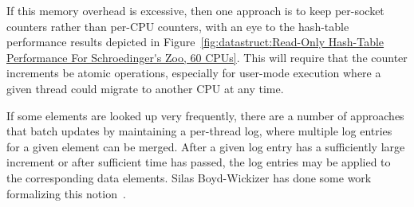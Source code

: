 If this memory overhead is excessive, then one approach is to keep
per-socket counters rather than per-CPU counters,
with an eye to the hash-table performance results depicted in
Figure~\ref{fig:datastruct:Read-Only Hash-Table Performance For Schroedinger's Zoo, 60 CPUs}.
This will require that the counter increments be atomic operations,
especially for user-mode execution where a given thread could migrate
to another CPU at any time.

If some elements are looked up very frequently, there are a number
of approaches that batch updates by maintaining a per-thread log,
where multiple log entries for a given element can be merged.
After a given log entry has a sufficiently large increment or after
sufficient time has passed, the log entries may be applied to the
corresponding data elements.
Silas Boyd-Wickizer has done some work formalizing this
notion~\cite{SilasBoydWickizerPhD}.
